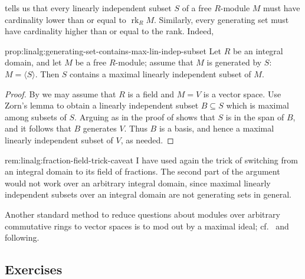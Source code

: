  tells us that every linearly independent subset $S$
of a free $R$-module $M$ must have cardinality lower than or equal to
$\operatorname{rk}_R M$. Similarly, every generating set must have
cardinality higher than or equal to the rank. Indeed,

\begin{prop}{}{prop:linalg:generating-set-contains-max-lin-indep-subset}
  Let $R$ be an integral domain, and let $M$ be a free $R$-module;
  assume that $M$ is generated by $S$: $M = \langle S \rangle$. Then
  $S$ contains a maximal linearly independent subset of $M$.
\end{prop}
\begin{proof}
  By  we
  may assume that $R$ is a field and $M = V$ is a vector space. Use
  Zorn's lemma to obtain a linearly independent subset $B \subseteq S$
  which is maximal among subsets of $S$. Arguing as in the proof of
   shows that $S$ is in the span of $B$, and it
  follows that $B$ generates $V$. Thus $B$ is a basis, and hence a
  maximal linearly independent subset of $V$, as needed.
\end{proof}

\begin{rem}{}{rem:linalg:fraction-field-trick-caveat}
  I have used again the trick of switching from an integral domain to
  its field of fractions. The second part of the argument would not
  work over an arbitrary integral domain, since maximal linearly
  independent subsets over an integral domain are not generating sets
  in general.

  Another standard method to reduce questions about modules over
  arbitrary commutative rings to vector spaces is to mod out by a
  maximal ideal; cf.\
  and following.
\end{rem}

\subsection*{Exercises}


